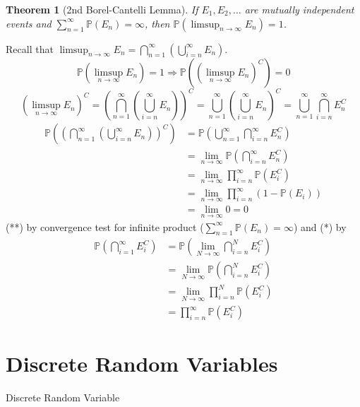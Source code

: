 \documentclass[a4paper,11pt]{amsbook}
\makeatletter
\def\section{\@startsection{section}{2}%
    \z@{1\linespacing\@plus1\linespacing}{.5\linespacing}%
    {\large\normalfont\bfseries\centering\color{darkblue}}}
\renewenvironment{proof}[1][\proofname]{\par
    \pushQED{\qed}%
    \normalfont \topsep6\p@\@plus6\p@\relax
    \trivlist
    \itemindent\z@ %
    \item[\hskip\labelsep
          \scshape
      #1\@addpunct{.}]\ignorespaces
}{%
    \popQED\endtrivlist\@endpefalse
}
\newtheorem{theorem}{\hspace{-2em} \color{darkblue} Theorem}[chapter]
\theoremstyle{definition}
\theoremstyle{remark}
\renewcommand{\P}{\mathbb{P}}
\newcommand\0{\varnothing}
\makeatother
\begin{document}
    \begin{theorem}[2nd Borel-Cantelli Lemma]{}
        If $E_1,E_2,\ldots$ are mutually independent events and $\sum_{n=1}^\infty\P(E_n)=\infty$,
        then $\P\left(\limsup_{n\to\infty}E_n\right)=1$.
    \end{theorem}
    \begin{proof}
        Recall that $\limsup_{n\to\infty}E_n=\bigcap_{n=1}^\infty\left(\bigcup_{i=n}^\infty E_n\right)$.
        $$\P\left(\limsup_{n\to\infty}E_n\right)=1\Rightarrow\P\left(\left(\limsup_{n\to\infty}E_n\right)^C\right)=0$$
        $$\left(\limsup_{n\to\infty}E_n\right)^C=\left(\bigcap_{n=1}^\infty\left(\bigcup_{i=n}^\infty E_n\right)\right)^C
        =\bigcup_{n=1}^\infty\left(\bigcup_{i=n}^\infty E_n\right)^C=\bigcup_{n=1}^\infty\bigcap_{i=n}^\infty E_n^C$$
        \begin{align*}
            \P\left(\left(\bigcap_{n=1}^\infty\left(\bigcup_{i=n}^\infty E_n\right)\right)^C\right)
            &=\P\left(\bigcup_{n=1}^\infty\bigcap_{i=n}^\infty E_n^C\right) \\
            &=\lim_{n\to\infty}\P\left(\bigcap_{i=n}^\infty E_n^C\right) \tag{continuity}\\
            &=\lim_{n\to\infty}\prod_{i=n}^\infty\P(E_i^C) \tag{independence, *}\\
            &=\lim_{n\to\infty}\prod_{i=n}^\infty(1-\P(E_i)) \\
            &=\lim_{n\to\infty}0=0 \tag{**}
        \end{align*}
        (**) by convergence test for infinite product ($\sum_{n=1}^\infty\P(E_n)=\infty$) and (*) by
        \begin{align*}
            \P\left(\bigcap_{i=1}^\infty E_i^C\right)&=\P\left(\lim_{N\to\infty}\bigcap_{i=n}^NE_i^C\right) \\
            &=\lim_{N\to\infty}\P\left(\bigcap_{i=n}^NE_i^C\right) \tag{continuity}\\
            &=\lim_{N\to\infty}\prod_{i=n}^N\P(E_i^C) \tag{independence}\\
            &=\prod_{i=n}^\infty\P(E_i^C)
        \end{align*}
    \end{proof}
    
\chapter{Discrete Random Variables}

    \section{Discrete Random Variable}
\end{document}
